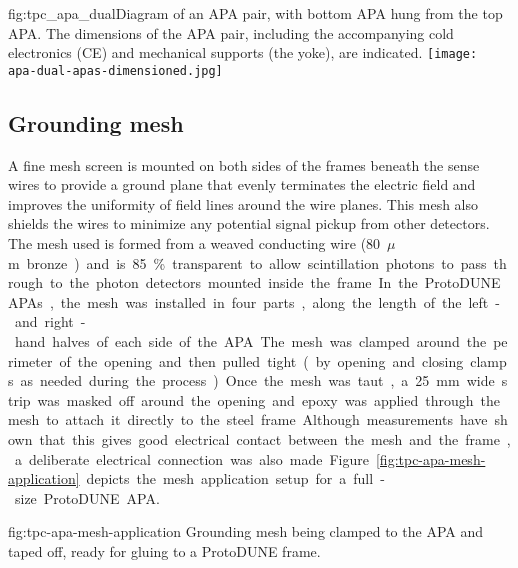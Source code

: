\begin{dunefigure}{fig:tpc_apa_dual}{Diagram of an APA pair, with bottom APA hung from the top APA. The dimensions of the APA pair, including the accompanying cold electronics (CE) and mechanical supports (the yoke), are indicated.}
\texttt{[image: apa-dual-apas-dimensioned.jpg]} 
\end{dunefigure}


\subsection{Grounding mesh}
\label{sec:fdsp-apa-mesh}

A fine mesh screen is mounted on both sides of the frames beneath the sense wires to provide a ground plane that evenly terminates the electric field and improves the uniformity of field lines around the wire planes.  This mesh also shields the wires to minimize any potential signal pickup from other detectors.  The mesh used is formed from a weaved conducting wire (\SI{80}{$\mu$m} bronze) and is 85\% transparent to allow scintillation photons to pass through to the photon detectors mounted inside the frame. 

In the ProtoDUNE APAs, the mesh was installed in four parts, along the length of the left- and right-hand halves of each side of the APA. The mesh was clamped around the perimeter of the opening and then pulled tight (by opening and closing clamps as needed during the process).  Once the mesh was taut, a \SI{25}{mm} wide strip was masked off around the opening and epoxy was applied through the mesh to attach it directly to the steel frame.  Although measurements have shown that this gives good electrical contact between the mesh and the frame, a deliberate electrical connection was also made.  Figure~\ref{fig:tpc-apa-mesh-application} depicts the mesh application setup for a full-size ProtoDUNE APA.

\begin{dunefigure}{fig:tpc-apa-mesh-application}
{Grounding mesh being clamped to the APA and taped off, ready for gluing to a ProtoDUNE frame.}
\setlength{\fboxsep}{0pt}
\setlength{\fboxrule}{0.5pt}
 \quad
{}
\end{dunefigure}

